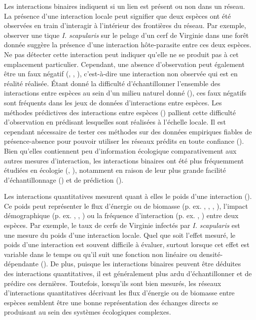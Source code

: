 Les interactions binaires indiquent si un lien est présent ou non dans un
réseau. La présence d'une interaction locale peut signifier que deux espèces ont
été observées en train d'interagir à l'intérieur des frontières du réseau. Par
exemple, observer une tique \textit{I. scapularis} sur le pelage d'un cerf de
Virginie dans une forêt donnée suggère la présence d'une interaction
hôte-parasite entre ces deux espèces. Ne pas détecter cette interaction peut
indiquer qu'elle ne se produit pas à cet emplacement particulier. Cependant, une
absence d'observation peut également être un faux négatif
(\cite{Bluthgen2010Why}, \cite{Chacoff2012Evaluating}, \cite{Stock2017Linear}),
c'est-à-dire une interaction non observée qui est en réalité réalisée. Étant
donné la difficulté d'échantillonner l'ensemble des interactions entre espèces
au sein d'un milieu naturel donné (\cite{Jordano2016Sampling}), ces faux
négatifs sont fréquents dans les jeux de données d'interactions entre espèces.
Les méthodes prédictives des interactions entre espèces
(\cite{Strydom2021Roadmapa}) pallient cette difficulté d'observation en
prédisant lesquelles sont réalisées à l'échelle locale. Il est cependant
nécessaire de tester ces méthodes sur des données empiriques fiables de
présence-absence pour pouvoir utiliser les réseaux prédits en toute confiance
(\cite{Brimacombe2024Applying}). Bien qu'elles contiennent peu d'information
écologique comparativement aux autres mesures d'interaction, les interactions
binaires ont été plus fréquemment étudiées en écologie
(\cite{Pascual2006Ecological}, \cite{Delmas2019Analysing}), notamment en raison
de leur plus grande facilité d'échantillonnage (\cite{Jordano2016Sampling}) et
de prédiction (\cite{Strydom2021Roadmapa}).

Les interactions quantitatives mesurent quant à elles le poids d'une interaction
(\cite{Berlow2004Interaction}). Ce poids peut représenter le flux d'énergie ou
de biomasse (p. ex. \cite{Benke2001Food}, \cite{Post2002Long},
\cite{Bersier2002Quantitative}, \cite{Borrett2019Walk}), l'impact démographique
(p. ex. \cite{Paine1992Foodweb}, \cite{Kokkoris2002Variability},
\cite{Emmerson2004Predatorprey}) ou la fréquence d'interaction (p. ex.
\cite{Herrera1989Pollinator}, \cite{Montoya2003Food}) entre deux espèces. Par
exemple, le taux de cerfs de Virginie infectés par \textit{I. scapularis} est
une mesure du poids d'une interaction locale. Quel que soit l'effet mesuré, le
poids d'une interaction est souvent difficile à évaluer, surtout lorsque cet
effet est variable dans le temps ou qu'il suit une fonction non linéaire ou
densité-dépendante (\cite{Wootton2005Measurement}). De plus, puisque les
interactions binaires peuvent être déduites des interactions quantitatives, il
est généralement plus ardu d'échantillonner et de prédire ces dernières.
Toutefois, lorsqu'ils sont bien mesurés, les réseaux d'interactions
quantitatives décrivant les flux d'énergie ou de biomasse entre espèces semblent
être une bonne représentation des échanges directs se produisant au sein des
systèmes écologiques complexes. 

